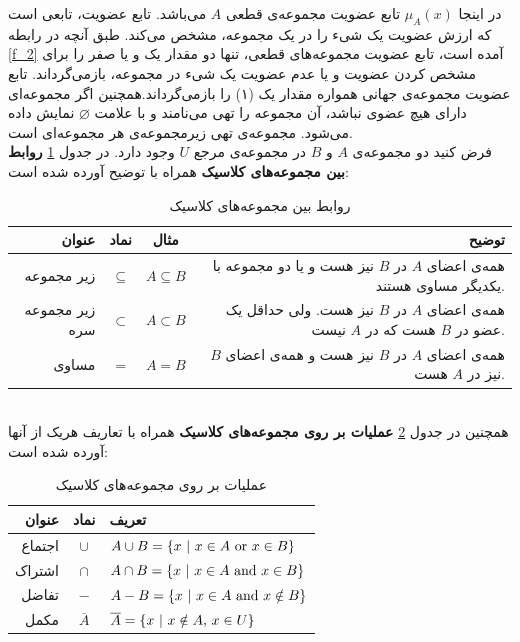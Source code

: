 \documentclass[12pt,a4paper]{article}
\begin{document}
در اینجا
$\mu_{A}(x)$
 تابع عضویت مجموعه‌ی قطعی $A$ می‌باشد. تابع عضویت، تابعی است که ارزش عضویت یک شیء را در یک مجموعه، مشخص می‌کند. طبق آنچه در رابطه
 \ref{f_2}
 آمده است، تابع عضویت مجموعه‌های قطعی، تنها دو مقدار یک و یا صفر را برای مشخص کردن عضویت و یا عدم عضویت یک شیء در مجموعه، بازمی‌گرداند. تابع عضویت مجموعه‌ی جهانی همواره مقدار یک (۱) را بازمی‌گرداند.همچنین اگر مجموعه‌ای دارای هیچ عضوی نباشد، آن مجموعه‌ را تهی
 می‌نامند و با علامت $\varnothing$ نمایش داده می‌شود. مجموعه‌ی تهی زیرمجموعه‌ی هر مجموعه‌ای است.
 \cite{Lee2005}
 \\
فرض کنید دو مجموعه‌ی $ A $ و $ B  $ در مجموعه‌ی مرجع $ U $ وجود دارد.  در جدول   
\ref{table:t_1}
\textbf{روابط بین مجموعه‌های کلاسیک} 
 همراه با توضیح آورده شده است:
\begin{table}[!htbp]
\begin{center}
	{\footnotesize
 \begin{tabular}{r c c r} \hline
عنوان & نماد &  مثال & توضیح  
\\\hline 
زیر مجموعه  &
$\subseteq$ &
$A \subseteq B$ &
همه‌ی اعضای $A$ در $B$ نیز هست و یا دو مجموعه با یکدیگر مساوی هستند.
\\
زیر مجموعه سره &
$\subset$ &
 $A \subset B$ &
همه‌ی اعضای $A$ در $B$ نیز هست. ولی حداقل یک عضو در $B$ هست که در $A$ نیست.
\\
مساوی &
$=$ &
$A = B$ &
همه‌ی اعضای $A$ در $B$ نیز هست و همه‌ی اعضای $B$ نیز در $A$ هست.
\\\hline
 \end{tabular}
 \caption{روابط بین مجموعه‌های کلاسیک}
 \label{table:t_1}
}
\end{center}
\end{table}
\\
همچنین در جدول
\ref{table:t_2}
\textbf{عملیات بر روی مجموعه‌های کلاسیک} 
همراه با تعاریف هریک از آنها آورده شده‌ است:
\begin{table}[!htbp]
	{\footnotesize
	\begin{center}
		\begin{tabular}{r c l} \hline
			عنوان & نماد & تعریف  
			\\\hline 
			اجتماع   &
			$\cup$ &
			$A \cup B = \{x\ |\ x \in A\ {\rm or}\ x \in B \}$ 
			\\
			اشتراک   &
			$\cap$ &
			$A \cap B = \{x\ |\ x \in A\ {\rm and}\ x \in B \}$ 
			\\
			تفاضل &
			$-$ &
			$A - B = \{x\ |\ x \in A\ {\rm and}\ x \notin B \}$ 
		   \\
			مکمل &
			$\overline{A}$ &
			$\overline{A} = \{x\ |\ x \notin A{\rm ,}\ x \in U \}$ 
			\\\hline 
		\end{tabular}
		\caption{عملیات بر روی مجموعه‌های کلاسیک}
		\label{table:t_2}
\end{center}
	}
\end{table} 
\\
\end{document}
